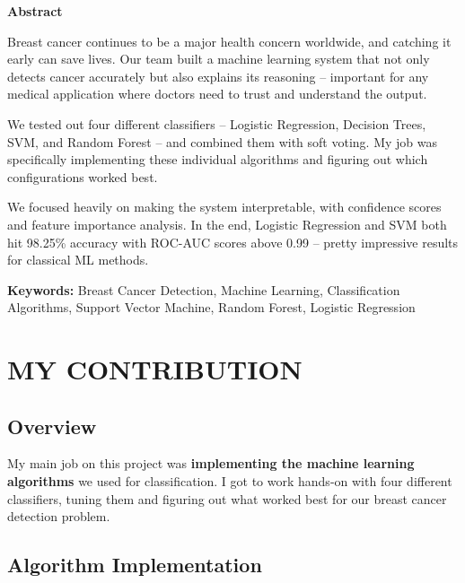 \documentclass[12pt]{article}
\begin{document}
\newpage
{}
\begin{center}
    \textbf{\Large Abstract}
\end{center}

\noindent Breast cancer continues to be a major health concern worldwide, and catching it early can save lives. Our team built a machine learning system that not only detects cancer accurately but also explains its reasoning -- important for any medical application where doctors need to trust and understand the output.

\vspace{0.5cm}
\noindent We tested out four different classifiers -- Logistic Regression, Decision Trees, SVM, and Random Forest -- and combined them with soft voting. My job was specifically implementing these individual algorithms and figuring out which configurations worked best.

\vspace{0.5cm}
\noindent We focused heavily on making the system interpretable, with confidence scores and feature importance analysis. In the end, Logistic Regression and SVM both hit 98.25\% accuracy with ROC-AUC scores above 0.99 -- pretty impressive results for classical ML methods.

\vspace{0.5cm}
\noindent \textbf{Keywords:} Breast Cancer Detection, Machine Learning, Classification Algorithms, Support Vector Machine, Random Forest, Logistic Regression

\newpage
\tableofcontents

\newpage
{}
\section{MY CONTRIBUTION}

\subsection{Overview}
My main job on this project was \textbf{implementing the machine learning algorithms} we used for classification. I got to work hands-on with four different classifiers, tuning them and figuring out what worked best for our breast cancer detection problem.

\subsection{Algorithm Implementation}
\end{document}
